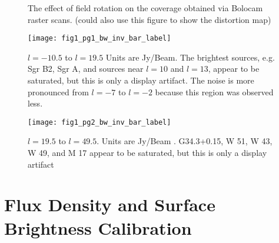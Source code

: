 \documentclass[12pt,preprint]{aastex}
\newcommand{\mum}{\ensuremath{\mu \mathrm{m}}}
\def\Figure#1#2#3#4{
\begin{figure}[htb]
\epsscale{#4}
\plotone{#1}
\caption{#2}
\label{#3}
\end{figure}
}
\begin{document}
\Figure{scan_10deg}{The effect of field rotation on the coverage
obtained via Bolocam raster scans.  (could also use this figure to
show the distortion map)}{fig:Array}{1.0}

\begin{center}
  \begin{figure}[t]
    \texttt{[image: fig1\_pg1\_bw\_inv\_bar\_label]}
    \caption{$l=-10.5$ to $l=19.5$ Units are Jy/Beam.  The brightest
      sources, e.g. Sgr B2, Sgr A, and sources near $l=10$ and
      $l=13$, appear to be saturated, but this is only a display
      artifact.  The noise is more pronounced from $l=-7$ to $l=-2$
      because this region was observed less.}
    \label{fig:galplane_p1}
  \end{figure}

  \begin{figure} 
    \texttt{[image: fig1\_pg2\_bw\_inv\_bar\_label]} 
    \caption{$l=19.5$ to $l=49.5$.  Units are Jy/Beam .  G34.3+0.15, W
      51, W 43, W 49, and M 17 appear to be saturated, but this is
      only a display artifact}
    \label{fig:galplane_p2}
  \end{figure}
\end{center}


  






%
\section{Flux Density and Surface Brightness Calibration}
\end{document}
